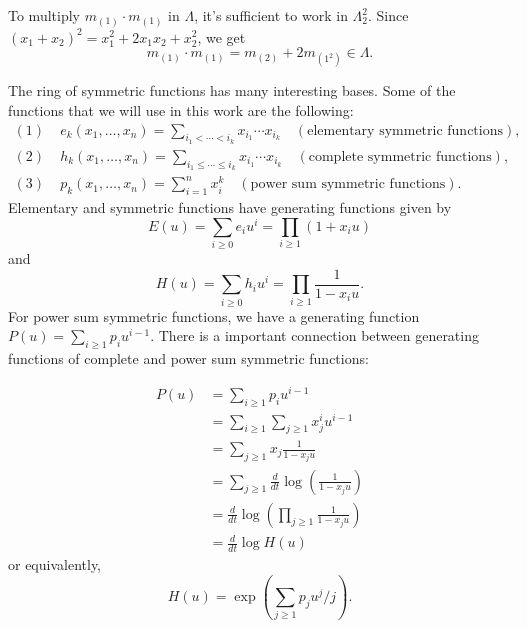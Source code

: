 \begin{dang}
    \begin{example}
        To multiply $m_{(1)}\cdot m_{(1)}$ in $\Lambda$, it's sufficient to work in $\Lambda_2^2$. Since $(x_1+x_2)^2=x_1^2+2x_1x_2+x_2^2$, we get 
        \begin{equation}
            m_{(1)}\cdot m_{(1)}=m_{(2)}+2m_{(1^2)}\in \Lambda.
        \end{equation}
    \end{example}
\end{dang}
The ring of symmetric functions has many interesting bases. Some of the functions that we will use in this work are the following:
\begin{align*}
    (1)&\;e_k(x_1,\dots,x_n)=\sum_{i_1<\cdots<i_k}x_{i_1}\cdots x_{i_k}\quad(\text{elementary symmetric functions}),\\
    (2)&\;h_k(x_1,\dots,x_n)=\sum_{i_1\leq\cdots\leq i_k}x_{i_1}\cdots x_{i_k}\quad(\text{complete symmetric functions}),\\
    (3)&\;p_k(x_1,\dots,x_n)=\sum_{i=1}^nx_i^k\quad(\text{power sum symmetric functions}).
\end{align*}
Elementary and symmetric functions have generating functions given by
\begin{equation}\label{Equation: generating function of elementary symmetric}
    E(u)=\sum_{i\geq0}e_iu^i= \prod_{i\geq1}(1+x_iu)
\end{equation}
and
\begin{equation}
    H(u)=\sum_{i\geq0}h_iu^i=\prod_{i\geq1}\frac{1}{1-x_iu}.
\end{equation}
For power sum symmetric functions, we have a generating function $P(u)=\sum_{i\geq1}p_iu^{i-1}$. There is a important connection between generating functions of complete and power sum symmetric functions:

\begin{equation}
    \begin{split}
        P(u)&= \sum_{i\geq 1}p_iu^{i-1}\\
        &=\sum_{i\geq1}\sum_{j\geq1}x_j^iu^{i-1}\\
        &=\sum_{j\geq1}x_j\frac{1}{1-x_ju}\\
        &=\sum_{j\geq1}\frac{d}{dt}\log\left(\frac{1}{1-x_ju}\right)\\
        &=\frac{d}{dt}\log\left(\prod_{j\geq1}\frac{1}{1-x_ju}\right)\\
        &=\frac{d}{dt}\log H(u)
    \end{split}
\end{equation}
or equivalently,
\begin{equation}\label{Equation: H(u)=exp(...)}
    H(u)=\exp\left(\sum_{j\geq1}p_ju^j/j\right).
\end{equation}

